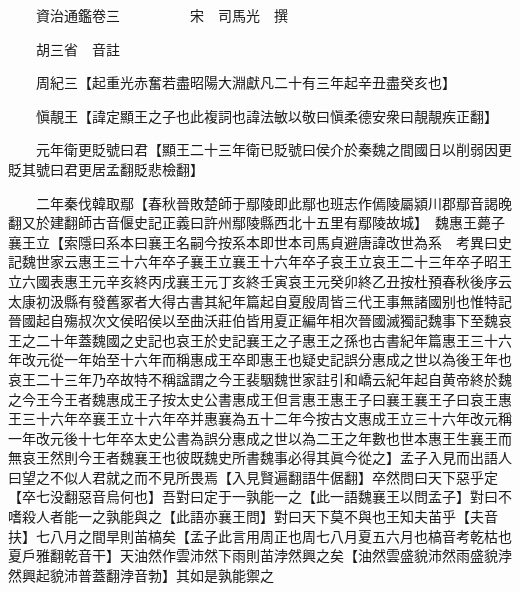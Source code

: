 










 


 
 


 

  
  
  
  
  





  
  
  
  
  
 
  

  

  
  
  



  

 
 

  
   




  

  
  


  　　資治通鑑卷三　　　　　宋　司馬光　撰

　　胡三省　音註

　　周紀三【起重光赤奮若盡昭陽大淵獻凡二十有三年起辛丑盡癸亥也】

　　愼靚王【諱定顯王之子也此複詞也諱法敏以敬曰愼柔德安衆曰靚靚疾正翻】

　　元年衛更貶號曰君【顯王二十三年衛已貶號曰侯介於秦魏之間國日以削弱因更貶其號曰君更居孟翻貶悲檢翻】

　　二年秦伐韓取鄢【春秋晉敗楚師于鄢陵即此鄢也班志作傿陵屬潁川郡鄢音謁晚翻又於建翻師古音偃史記正義曰許州鄢陵縣西北十五里有鄢陵故城】　魏惠王薨子襄王立【索隱曰系本曰襄王名嗣今按系本即世本司馬貞避唐諱改世為系　考異曰史記魏世家云惠王三十六年卒子襄王立襄王十六年卒子哀王立哀王二十三年卒子昭王立六國表惠王元辛亥終丙戌襄王元丁亥終壬寅哀王元癸卯終乙丑按杜預春秋後序云太康初汲縣有發舊冢者大得古書其紀年篇起自夏殷周皆三代王事無諸國别也惟特記晉國起自殤叔次文侯昭侯以至曲沃莊伯皆用夏正編年相次晉國滅獨記魏事下至魏哀王之二十年蓋魏國之史記也哀王於史記襄王之子惠王之孫也古書紀年篇惠王三十六年改元從一年始至十六年而稱惠成王卒即惠王也疑史記誤分惠成之世以為後王年也哀王二十三年乃卒故特不稱諡謂之今王裴駰魏世家註引和嶠云紀年起自黄帝終於魏之今王今王者魏惠成王子按太史公書惠成王但言惠王惠王子曰襄王襄王子曰哀王惠王三十六年卒襄王立十六年卒并惠襄為五十二年今按古文惠成王立三十六年改元稱一年改元後十七年卒太史公書為誤分惠成之世以為二王之年數也世本惠王生襄王而無哀王然則今王者魏襄王也彼既魏史所書魏事必得其眞今從之】孟子入見而出語人曰望之不似人君就之而不見所畏焉【入見賢遍翻語牛倨翻】卒然問曰天下惡乎定【卒七没翻惡音烏何也】吾對曰定于一孰能一之【此一語魏襄王以問孟子】對曰不嗜殺人者能一之孰能與之【此語亦襄王問】對曰天下莫不與也王知夫苖乎【夫音扶】七八月之間旱則苖槁矣【孟子此言用周正也周七八月夏五六月也槁音考乾枯也夏戶雅翻乾音干】天油然作雲沛然下雨則苖浡然興之矣【油然雲盛貌沛然雨盛貌浡然興起貌沛普蓋翻浡音勃】其如是孰能禦之

